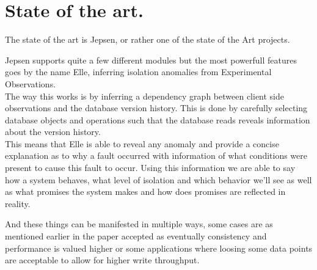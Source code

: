 \documentclass[a4paper,10pt,titlepage]{report}
\begin{document}
    \section{State of the art.}

    The state of the art is Jepsen, or rather one of the state of the Art projects.

    Jepsen supports quite a few different modules but the most powerfull features goes by the name Elle, inferring isolation anomalies from Experimental Observations. \\
    \vspace{5mm}
    The way this works is by inferring a dependency graph between client side observations and the database version history. This is done by carefully selecting database objects and operations such that the database reads reveals information about the version history.\\
    \vspace{5mm}
    This means that Elle is able to reveal any anomaly and provide a concise explanation as to why a fault occurred with information of what conditions were present to cause this fault to occur. Using this information we are able to say how a system behaves, what level of isolation and which behavior we'll see as well as what promises the system makes and how does promises are reflected in reality.\\
    \vspace{5mm}

    And these things can be manifested in multiple ways, some cases are as mentioned earlier in the paper accepted as eventually consistency and performance is valued higher or some applications where loosing some data points are acceptable to allow for higher write throughput.\\
    \vspace{5mm}
\end{document}
